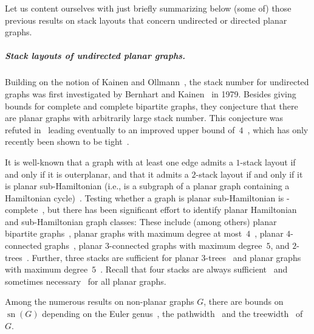 \documentclass{theoretics}
\DeclareMathOperator{\sn}{sn}
\begin{document}
Let us content ourselves with just briefly summarizing below (some of) those previous results on stack layouts that concern undirected or directed planar graphs.



\subparagraph{Stack layouts of undirected planar graphs.}
Building on the notion of Kainen and Ollmann~\cite{Kainen1974_BookThickness,Ollmann1973_BookThickness}, the stack number for undirected graphs was first investigated by Bernhart and Kainen~\cite{Bernhart1979_BookThickness} in 1979.
Besides giving bounds for complete and complete bipartite graphs, they conjecture that there are planar graphs with arbitrarily large stack number.
This conjecture was refuted in~\cite{Buss1984_StacksPlanar,Heath1984_7StacksPlanar} leading eventually to an improved upper bound of~$4$~\cite{Yannakakis1989_4StacksPlanar}, which has only recently been shown to be tight~\cite{Bekos2020_4StacksPlanar,Yannakakis2020_4StacksPlanar}.

It is well-known that a graph with at least one edge admits a $1$-stack layout if and only if it is outerplanar, and that it admits a $2$-stack layout if and only if it is planar sub-Hamiltonian (i.e., is a subgraph of a planar graph containing a Hamiltonian cycle)~\cite{Bernhart1979_BookThickness}.
Testing whether a graph is planar sub-Hamiltonian is \NP-complete~\cite{Wigderson1982_HamiltonianCompletion}, but there has been significant effort to identify planar Hamiltonian and sub-Hamiltonian graph classes:
These include (among others) planar bipartite graphs~\cite{DeFraysseix1995_PlanarBipartite}, planar graphs with maximum degree at most~$4$~\cite{Bekos2016_Deg4Hamiltonian}, planar $4$-connected graphs~\cite{Tutte1956_4ConnectedHamiltonian}, planar $3$-connected graphs with maximum degree~$5$, and $2$-trees~\cite{Rengarajan1995_Stacks2Trees}.
Further, three stacks are sufficient for planar $3$-trees~\cite{Heath1984_7StacksPlanar} and planar graphs with maximum degree~$5$~\cite{Guan2020_Deg5Planar}.
Recall that four stacks are always sufficient~\cite{Yannakakis1989_4StacksPlanar} and sometimes necessary~\cite{Bekos2020_4StacksPlanar,Yannakakis2020_4StacksPlanar} for all planar graphs.

Among the numerous results on non-planar graphs $G$, there are bounds on $\sn(G)$ depending on the Euler genus~\cite{Malitz1994_EulerGenus}, the pathwidth~\cite{Togasaki2002_Pathwidth} and the treewidth~\cite{Ganley2001_Treewidth,Dujmovic2007_treewidth,Vandenbussche2009_kTrees} of $G$.
\end{document}
